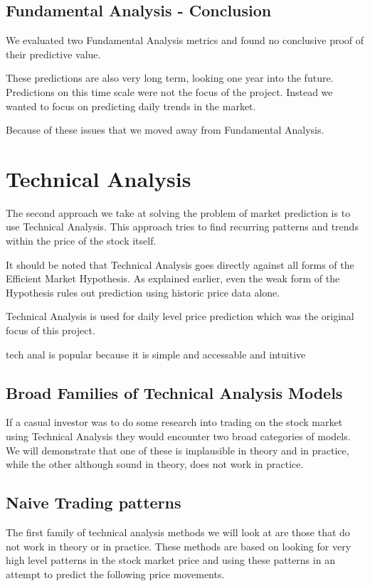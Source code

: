 \documentclass{report}
\begin{document}
\section{Fundamental Analysis - Conclusion}

We evaluated two Fundamental Analysis metrics and found no conclusive proof of their predictive value.  

These predictions are also very long term, looking one year into the future. Predictions on this time scale were not the focus of the project. Instead we wanted to focus on predicting daily trends in the market.

Because of these issues that we moved away from Fundamental Analysis.

\chapter{Technical Analysis}


The second approach we take at solving the problem of market prediction is to use Technical Analysis. This approach tries to find recurring patterns and trends within the price of the stock itself.

It should be noted that Technical Analysis goes directly against all forms of the Efficient Market Hypothesis. As explained earlier, even the weak form of the Hypothesis rules out prediction using historic price data alone.

Technical Analysis is used for daily level price prediction which was the original focus of this project. 

tech anal is popular because it is simple and accessable and intuitive

\section{Broad Families of Technical Analysis Models}

If a casual investor was to do some research into trading on the stock market using Technical Analysis they would encounter two broad categories of models. We will demonstrate that one of these is implausible in theory and in practice, while the other although sound in theory, does not work in practice.

\section{Naive Trading patterns}

The first family of technical analysis methods we will look at are those that do not work in theory or in practice. These methods are based on looking for very high level patterns in the stock market price and using these patterns in an attempt to predict the following price movements.
\end{document}
